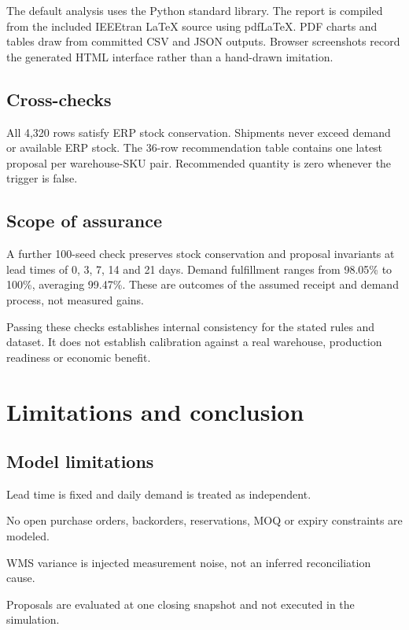 \documentclass[conference,letterpaper]{IEEEtran}
\begin{document}
The default analysis uses the Python standard library. The report is compiled from the included IEEEtran LaTeX source using pdfLaTeX. PDF charts and tables draw from committed CSV and JSON outputs. Browser screenshots record the generated HTML interface rather than a hand-drawn imitation.


\subsection{Cross-checks}

All 4,320 rows satisfy ERP stock conservation. Shipments never exceed demand or available ERP stock. The 36-row recommendation table contains one latest proposal per warehouse-SKU pair. Recommended quantity is zero whenever the trigger is false.


\subsection{Scope of assurance}

A further 100-seed check preserves stock conservation and proposal invariants at lead times of 0, 3, 7, 14 and 21 days. Demand fulfillment ranges from 98.05\% to 100\%, averaging 99.47\%. These are outcomes of the assumed receipt and demand process, not measured gains.

Passing these checks establishes internal consistency for the stated rules and dataset. It does not establish calibration against a real warehouse, production readiness or economic benefit.


\section{Limitations and conclusion}

\subsection{Model limitations}

\textbullet{} Lead time is fixed and daily demand is treated as independent.


\textbullet{} No open purchase orders, backorders, reservations, MOQ or expiry constraints are modeled.


\textbullet{} WMS variance is injected measurement noise, not an inferred reconciliation cause.


\textbullet{} Proposals are evaluated at one closing snapshot and not executed in the simulation.
\end{document}
